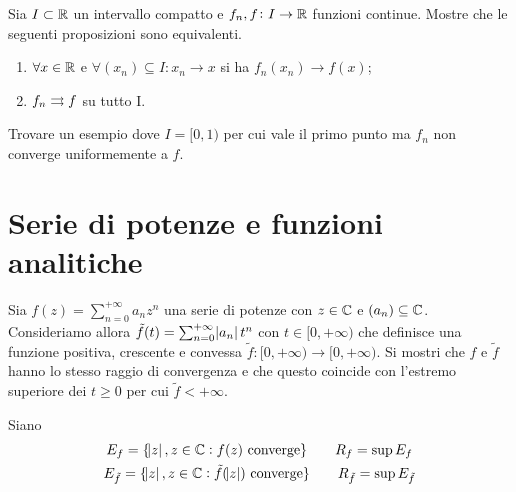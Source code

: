 \documentclass[a4paper]{article}\par \usepackage{style}\par
\begin{document}
\begin{es}
  Sia $ I \subset \mathbb{R} $ un intervallo compatto e $ f_n, f \colon I \to \mathbb{R} $ funzioni continue. Mostre che le seguenti proposizioni sono equivalenti.
  \begin{enumerate}[label = (\roman*)]
  \item $ \forall x \in \mathbb{R} $ e $ \forall (x_n) \subseteq I : x_n \to x $ si ha $ f_n(x_n) \to f(x) $;
  \item $ f_n \rightrightarrows f $ su tutto I.
  \end{enumerate}
  Trovare un esempio dove $ I = [0, 1) $ per cui vale il primo punto ma $ f_n $ non converge uniformemente a $ f $.
\end{es}\par \section{Serie di potenze e funzioni analitiche}
\begin{es}
  Sia $ f(z) = \sum_{n = 0}^{+\infty} a_n z^n $ una serie di potenze con $ z \in \mathbb{C} $ e $ (a_n) \subseteq \mathbb{C} $. Consideriamo allora $ \tilde{f}(t) = \sum_{n = 0}^{+\infty } \abs{a_n} t^n $ con $ t \in [0, +\infty) $ che definisce una funzione positiva, crescente e convessa $ \tilde{f} \colon [0, +\infty) \to [0, +\infty) $. Si mostri che $ f $ e $ \tilde{f} $ hanno lo stesso raggio di convergenza e che questo coincide con l'estremo superiore dei $ t \geq 0 $ per cui $ \tilde{f} < +\infty $.
\end{es}\par Siano
\begin{gather*}
  E_f = \{\abs{z}, z \in \mathbb{C} : f(z) \text{ converge}\} \qquad R_f = \sup{E_f} \\
  E_{\tilde{f}} = \{\abs{z}, z \in \mathbb{C} : \tilde{f}(\abs{z}) \text{ converge}\} \qquad R_{\tilde{f}} = \sup{E_{\tilde{f}}}
\end{gather*}
\end{document}
